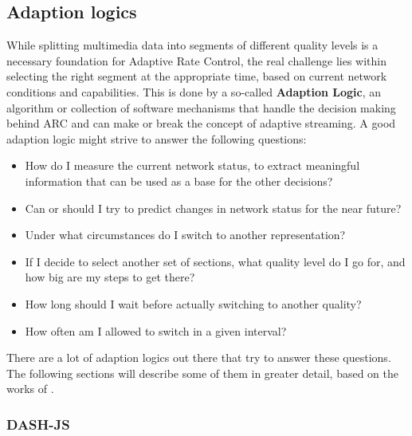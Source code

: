 \subsection{Adaption logics}
While splitting multimedia data into segments of different quality levels is a necessary foundation for Adaptive Rate Control, the real challenge lies within selecting the right segment at the appropriate time, based on current network conditions and capabilities. This is done by a so-called \textbf{Adaption Logic}, an algorithm or collection of software mechanisms that handle the decision making behind ARC and can make or break the concept of adaptive streaming. A good adaption logic might strive to answer the following questions: 

\begin{itemize}
	
	\item How do I measure the current network status, to extract meaningful information that can be used as a base for the other decisions? 
	
	\item Can or should I try to predict changes in network status for the near future? 
	
	\item Under what circumstances do I switch to another representation? 
	
	\item If I decide to select another set of sections, what quality level do I go for, and how big are my steps to get there? 
	
	\item How long should I wait before actually switching to another quality? 
	
	\item How often am I allowed to switch in a given interval?
	
\end{itemize}

There are a lot of adaption logics out there that try to answer these questions. The following sections will describe some of them in greater detail, based on the works of \cite{TiMR16}.

\subsubsection{DASH-JS} 


